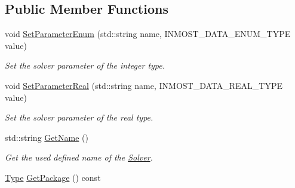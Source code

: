 \subsection*{Public Member Functions}
\begin{DoxyCompactItemize}
\item 
void \hyperlink{classINMOST_1_1Solver_a099f1bc2e5f530a30ff37f5fc3033d8a}{Set\-Parameter\-Enum} (std\-::string name, I\-N\-M\-O\-S\-T\-\_\-\-D\-A\-T\-A\-\_\-\-E\-N\-U\-M\-\_\-\-T\-Y\-P\-E value)
\begin{DoxyCompactList}\small\item\em Set the solver parameter of the integer type. \end{DoxyCompactList}\item 
void \hyperlink{classINMOST_1_1Solver_a7997f1ad3cce898632e582de27f08a42}{Set\-Parameter\-Real} (std\-::string name, I\-N\-M\-O\-S\-T\-\_\-\-D\-A\-T\-A\-\_\-\-R\-E\-A\-L\-\_\-\-T\-Y\-P\-E value)
\begin{DoxyCompactList}\small\item\em Set the solver parameter of the real type. \end{DoxyCompactList}\item 
\hypertarget{classINMOST_1_1Solver_a19a57bde95128504e8c9cecde896ae53}{std\-::string \hyperlink{classINMOST_1_1Solver_a19a57bde95128504e8c9cecde896ae53}{Get\-Name} ()}\label{classINMOST_1_1Solver_a19a57bde95128504e8c9cecde896ae53}

\begin{DoxyCompactList}\small\item\em Get the used defined name of the \hyperlink{classINMOST_1_1Solver}{Solver}. \end{DoxyCompactList}\item 
\hypertarget{classINMOST_1_1Solver_a76ba3fc72df7ccf55bab47251265c576}{\hyperlink{classINMOST_1_1Solver_ad21ba852fdfe10116b40aac266c0309b}{Type} \hyperlink{classINMOST_1_1Solver_a76ba3fc72df7ccf55bab47251265c576}{Get\-Package} () const }\label{classINMOST_1_1Solver_a76ba3fc72df7ccf55bab47251265c576}


\end{DoxyCompactItemize}
